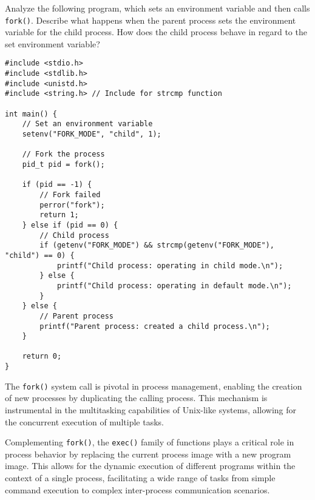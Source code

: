 \documentclass{dcbl/challenge}
\begin{document}
\begin{aufgabe}
Analyze the following program, which sets an environment variable and then calls \texttt{fork()}. Describe what happens when the parent process sets the environment variable for the child process. How does the child process behave in regard to the set environment variable?

\begin{verbatim}
#include <stdio.h>
#include <stdlib.h>
#include <unistd.h>
#include <string.h> // Include for strcmp function

int main() {
    // Set an environment variable
    setenv("FORK_MODE", "child", 1);

    // Fork the process
    pid_t pid = fork();

    if (pid == -1) {
        // Fork failed
        perror("fork");
        return 1;
    } else if (pid == 0) {
        // Child process
        if (getenv("FORK_MODE") && strcmp(getenv("FORK_MODE"), "child") == 0) {
            printf("Child process: operating in child mode.\n");
        } else {
            printf("Child process: operating in default mode.\n");
        }
    } else {
        // Parent process
        printf("Parent process: created a child process.\n");
    }

    return 0;
}
\end{verbatim}
The \texttt{fork()} system call is pivotal in process management, enabling the creation of new processes by duplicating the calling process. This mechanism is instrumental in the multitasking capabilities of Unix-like systems, allowing for the concurrent execution of multiple tasks.

Complementing \texttt{fork()}, the \texttt{exec()} family of functions plays a critical role in process behavior by replacing the current process image with a new program image. This allows for the dynamic execution of different programs within the context of a single process, facilitating a wide range of tasks from simple command execution to complex inter-process communication scenarios.
\end{aufgabe}
\end{document}
